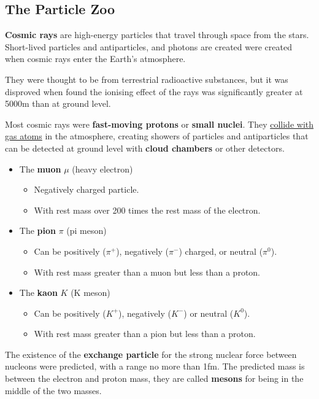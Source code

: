 \subsection{The Particle Zoo}

\textbf{Cosmic rays} are high-energy particles that travel through space from the stars. Short-lived particles and antiparticles, and photons are created were created when cosmic rays enter the Earth's atmosphere.

They were thought to be from terrestrial radioactive substances, but it was disproved when found the ionising effect of the rays was significantly greater at 5000m than at ground level.

Most cosmic rays were \textbf{fast-moving protons} or \textbf{small nuclei}. They \underline{collide with gas atoms} in the atmosphere, creating showers of particles and antiparticles that can be detected at ground level with \textbf{cloud chambers} or other detectors.
\begin{itemize}
    \item The \textbf{muon} $\mu$ (heavy electron)
        \begin{itemize}
            \item Negatively charged particle.
            \item With rest mass over 200 times the rest mass of the electron.
        \end{itemize}
    \item The \textbf{pion} $\pi$ (pi meson)
        \begin{itemize}
            \item Can be positively ($\pi^+$), negatively ($\pi^-$) charged, or neutral ($\pi^0$).
            \item With rest mass greater than a muon but less than a proton.
        \end{itemize}
    \item The \textbf{kaon} $K$ (K meson)
        \begin{itemize}
            \item Can be positively ($K^+$), negatively ($K^-$) or neutral ($K^0$).
            \item With rest mass greater than a pion but less than a proton.
        \end{itemize}
\end{itemize}

The existence of the \textbf{exchange particle} for the strong nuclear force between nucleons were predicted, with a range no more than 1fm. The predicted mass is between the electron and proton mass, they are called \textbf{mesons} for being in the middle of the two masses.


